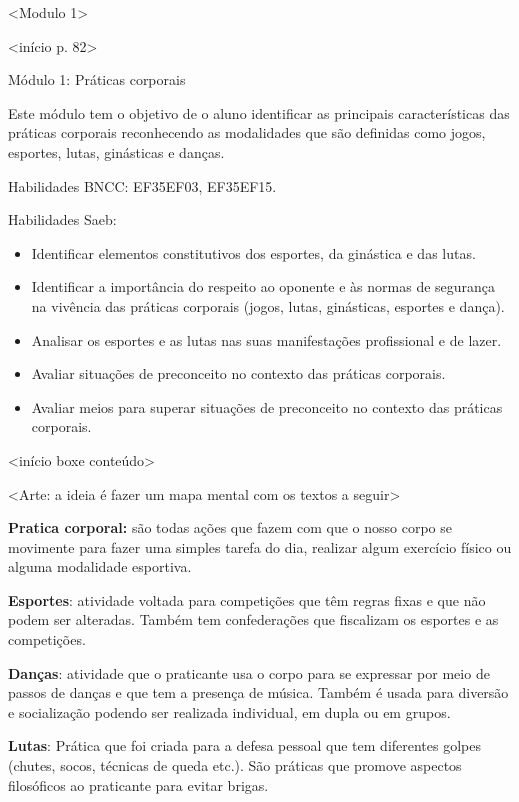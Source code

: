 \textless{}Modulo 1\textgreater{}

\textless{}início p. 82\textgreater{}

Módulo 1: Práticas corporais

Este módulo tem o objetivo de o aluno identificar as principais
características das práticas corporais reconhecendo as modalidades que
são definidas como jogos, esportes, lutas, ginásticas e danças.

Habilidades BNCC: EF35EF03, EF35EF15.

Habilidades Saeb:

\begin{itemize}
\item
  Identificar elementos constitutivos dos esportes, da ginástica e das
  lutas.
\item
  Identificar a importância do respeito ao oponente e às normas de
  segurança na vivência das práticas corporais (jogos, lutas,
  ginásticas, esportes e dança).
\item
  Analisar os esportes e as lutas nas suas manifestações profissional e
  de lazer.
\item
  Avaliar situações de preconceito no contexto das práticas corporais.
\item
  Avaliar meios para superar situações de preconceito no contexto das
  práticas corporais.
\end{itemize}

\textless{}início boxe conteúdo\textgreater{}

\textless{}Arte: a ideia é fazer um mapa mental com os textos a
seguir\textgreater{}

\textbf{Pratica corporal:} são todas ações que fazem com que o nosso
corpo se movimente para fazer uma simples tarefa do dia, realizar algum
exercício físico ou alguma modalidade esportiva.

\textbf{Esportes}: atividade voltada para competições que têm regras
fixas e que não podem ser alteradas. Também tem confederações que
fiscalizam os esportes e as competições.

\textbf{Danças}: atividade que o praticante usa o corpo para se
expressar por meio de passos de danças e que tem a presença de música.
Também é usada para diversão e socialização podendo ser realizada
individual, em dupla ou em grupos.

\textbf{Lutas}: Prática que foi criada para a defesa pessoal que tem
diferentes golpes (chutes, socos, técnicas de queda etc.). São práticas
que promove aspectos filosóficos ao praticante para evitar brigas.


